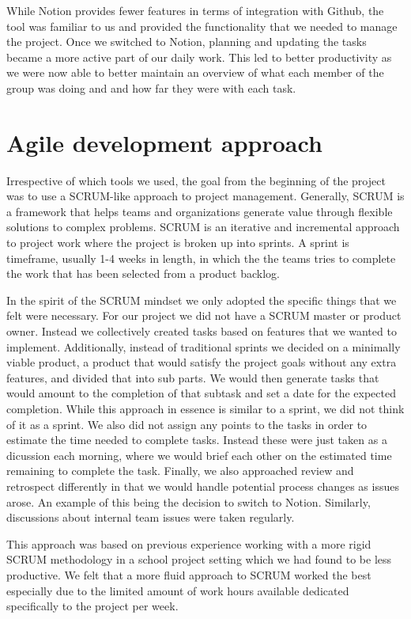 While Notion provides fewer features in terms of integration with Github, the tool was familiar to us and provided the functionality that we needed to manage the project.
Once we switched to Notion, planning and updating the tasks became a more active part of our daily work. This led to better productivity as we were now able to better maintain an overview of what each member of the group was doing and and how far they were with each task.

\section{Agile development approach} \label{sec:agile-dev}
Irrespective of which tools we used, the goal from the beginning of the project was to use a SCRUM-like approach to project management. 
Generally, SCRUM is a framework that helps teams and organizations generate value through flexible solutions to complex problems. SCRUM is an iterative and incremental approach to project work where the project is broken up into sprints. A sprint is timeframe, usually 1-4 weeks in length, in which the the teams tries to complete the work that has been selected from a product backlog.

In the spirit of the SCRUM mindset we only adopted the specific things that we felt were necessary. For our project we did not have a SCRUM master or product owner. Instead we collectively created tasks based on features that we wanted to implement. 
Additionally, instead of traditional sprints we decided on a minimally viable product, a product that would satisfy the project goals without any extra features, and divided that into sub parts. We would then generate tasks that would amount to the completion of that subtask and set a date for the expected completion. While this approach in essence is similar to a sprint, we did not think of it as a sprint. 
We also did not assign any points to the tasks in order to estimate the time needed to complete tasks. Instead these were just taken as a dicussion each morning, where we would brief each other on the estimated time remaining to complete the task.
Finally, we also approached review and retrospect differently in that we would handle potential process changes as issues arose. An example of this being the decision to switch to Notion. Similarly, discussions about internal team issues were taken regularly.

This approach was based on previous experience working with a more rigid SCRUM methodology in a school project setting which we had found to be less productive. We felt that a more fluid approach to SCRUM worked the best especially due to the limited amount of work hours available dedicated specifically to the project per week.



